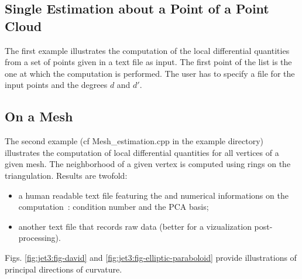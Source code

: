 \subsection{Single Estimation about a Point of a Point Cloud}

The first example illustrates the computation of the local
differential quantities from a set of points given in a text file as
input. The first point of the list is the one at which the computation
is performed. The user has to specify a file for the input points and
the degrees $d$ and $d'$.

\subsection{On a Mesh}
The second example (cf Mesh\_estimation.cpp in the example directory)
illustrates the computation of local differential quantities for all
vertices of a given mesh. The neighborhood of a given vertex is
computed using rings on the triangulation. Results are twofold:
\begin{itemize}
\item a human readable text file featuring the  and
  numerical informations on the computation~: condition number and the
  PCA basis;
\item another text file that records raw data (better for a vizualization
   post-processing).
\end{itemize}



Figs.
\ref{fig:jet3:fig-david} and
\ref{fig:jet3:fig-elliptic-paraboloid}
provide illustrations of principal directions of curvature.



